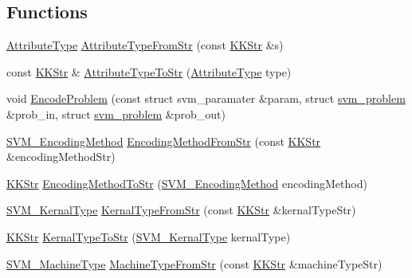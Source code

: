 \subsection*{Functions}
\begin{DoxyCompactItemize}
\item 
\hyperlink{namespace_k_k_m_l_l_a99973706982b59debba670e2480555ab}{Attribute\+Type} \hyperlink{namespace_k_k_m_l_l_a6ce7dcc549393faf321ebfb02f426e9e}{Attribute\+Type\+From\+Str} (const \hyperlink{class_k_k_b_1_1_k_k_str}{K\+K\+Str} \&s)
\item 
const \hyperlink{class_k_k_b_1_1_k_k_str}{K\+K\+Str} \& \hyperlink{namespace_k_k_m_l_l_a922b2d3446540a65714bf7387d90e6e2}{Attribute\+Type\+To\+Str} (\hyperlink{namespace_k_k_m_l_l_a99973706982b59debba670e2480555ab}{Attribute\+Type} type)
\item 
void \hyperlink{namespace_k_k_m_l_l_a58cbe9bc58626fbd609ec541e2b75237}{Encode\+Problem} (const struct svm\+\_\+paramater \&param, struct \hyperlink{struct_s_v_m233_1_1svm__problem}{svm\+\_\+problem} \&prob\+\_\+in, struct \hyperlink{struct_s_v_m233_1_1svm__problem}{svm\+\_\+problem} \&prob\+\_\+out)
\item 
\hyperlink{namespace_k_k_m_l_l_a1994af1d94ca5bf6e27f0cf803a8d64c}{S\+V\+M\+\_\+\+Encoding\+Method} \hyperlink{namespace_k_k_m_l_l_a100cc09ba8368cc433f3f8643e3d0abb}{Encoding\+Method\+From\+Str} (const \hyperlink{class_k_k_b_1_1_k_k_str}{K\+K\+Str} \&encoding\+Method\+Str)
\item 
\hyperlink{class_k_k_b_1_1_k_k_str}{K\+K\+Str} \hyperlink{namespace_k_k_m_l_l_ad6a1e63c0b52f7236e41cee6ce834273}{Encoding\+Method\+To\+Str} (\hyperlink{namespace_k_k_m_l_l_a1994af1d94ca5bf6e27f0cf803a8d64c}{S\+V\+M\+\_\+\+Encoding\+Method} encoding\+Method)
\item 
\hyperlink{namespace_k_k_m_l_l_a14bbc982261fe6adeaf682c543ef9569}{S\+V\+M\+\_\+\+Kernal\+Type} \hyperlink{namespace_k_k_m_l_l_a2d42a58e2c259554ae123c1b55c7af9f}{Kernal\+Type\+From\+Str} (const \hyperlink{class_k_k_b_1_1_k_k_str}{K\+K\+Str} \&kernal\+Type\+Str)
\item 
\hyperlink{class_k_k_b_1_1_k_k_str}{K\+K\+Str} \hyperlink{namespace_k_k_m_l_l_a67f1792cc365c2a57f00ab5ee2470ea4}{Kernal\+Type\+To\+Str} (\hyperlink{namespace_k_k_m_l_l_a14bbc982261fe6adeaf682c543ef9569}{S\+V\+M\+\_\+\+Kernal\+Type} kernal\+Type)
\item 
\hyperlink{namespace_k_k_m_l_l_ad917464bc631109a3021cf02cd27af9a}{S\+V\+M\+\_\+\+Machine\+Type} \hyperlink{namespace_k_k_m_l_l_a05f26527ddefaf91b278afcd8e7981e2}{Machine\+Type\+From\+Str} (const \hyperlink{class_k_k_b_1_1_k_k_str}{K\+K\+Str} \&machine\+Type\+Str)

\end{DoxyCompactItemize}
